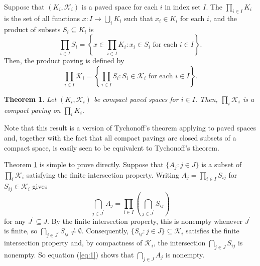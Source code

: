 \documentclass[12pt]{article}
\newtheorem{theorem}{Theorem}
\begin{document}

Suppose that $(K_i,\mathcal{K}_i)$ is a paved space for each $i$ in index set $I$. The  $\prod_{i\in I} K_i$ is the set of all functions $x\colon I\rightarrow\bigcup_iK_i$ such that $x_i\in K_i$ for each $i$, and the product of subsets $S_i\subseteq K_i$ is
\begin{equation*}
\prod_{i\in I}S_i=\left\{x\in\prod_{i\in I}K_i\colon x_i\in S_i\text{ for each }i\in I\right\}.
\end{equation*}
Then, the product paving is defined by
\begin{equation*}
\prod_{i\in I} \mathcal{K}_i=\left\{\prod_{i\in I}S_i\colon S_i\in\mathcal{K}_i\text{ for each }i\in I\right\}.
\end{equation*} 

\begin{theorem}\label{thm:1}
Let $(K_i,\mathcal{K}_i)$ be compact paved spaces for $i\in I$. Then, $\prod_i\mathcal{K}_i$ is a compact paving on $\prod_iK_i$.
\end{theorem}

Note that this result is a version of Tychonoff's theorem applying to paved spaces and, together with the fact that all compact pavings are closed subsets of a compact space, is easily seen to be equivalent to Tychonoff's theorem.

Theorem \ref{thm:1} is simple to prove directly. Suppose that $\{A_j\colon j\in J\}$ is a subset of $\prod_i \mathcal{K}_i$ satisfying the finite intersection property. Writing $A_j=\prod_{i\in I}S_{ij}$ for $S_{ij}\in\mathcal{K}_i$ gives
\begin{equation}\label{eq:1}
\bigcap_{j\in J^\prime}A_j=\prod_{i\in I}\left(\bigcap_{j\in J^\prime}S_{ij}\right)
\end{equation}
for any $J^\prime\subseteq J$. By the finite intersection property, this is nonempty whenever $J^\prime$ is finite, so $\bigcap_{j\in J^\prime}S_{ij}\not=\emptyset$. Consequently, $\{S_{ij}\colon j\in J\}\subseteq\mathcal{K}_i$ satisfies the finite intersection property and, by compactness of $\mathcal{K}_i$, the intersection $\bigcap_{j\in J}S_{ij}$ is nonempty. So equation (\ref{eq:1}) shows that $\bigcap_{j\in J}A_j$ is nonempty.

\end{document}
